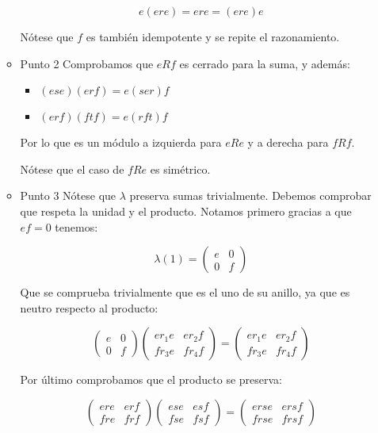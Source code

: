 \documentclass[11pt]{article}
\begin{document}
\begin{itemize}
\begin{itemize}
\[
e(ere) = ere = (ere)e
\]

Nótese que $f$ es también idempotente y se repite el razonamiento.

\item Punto 2
\label{sec-7-4-3-1-2}
Comprobamos que $eRf$ es cerrado para la suma, y además:

\begin{itemize}
\item $(ese)(erf) = e(ser)f$
\item $(erf)(ftf) = e(rft)f$
\end{itemize}

Por lo que es un módulo a izquierda para $eRe$ y a derecha para $fRf$.

Nótese que el caso de $fRe$ es simétrico.

\item Punto 3
\label{sec-7-4-3-1-3}
Nótese que $\lambda$ preserva sumas trivialmente. Debemos comprobar que respeta
la unidad y el producto. Notamos primero gracias a que $ef=0$ tenemos:

\[
\lambda(1) = \begin{pmatrix}e&0\\0&f\end{pmatrix}
\]

Que se comprueba trivialmente que es el uno de su anillo, ya que es neutro
respecto al producto:

\[\begin{pmatrix}e&0\\0&f\end{pmatrix}\begin{pmatrix}er_1e&er_2f\\fr_3e&fr_4f\end{pmatrix} =\begin{pmatrix}er_1e&er_2f\\fr_3e&fr_4f\end{pmatrix}\]

Por último comprobamos que el producto se preserva:

\[\begin{pmatrix}ere&erf\\fre&frf\end{pmatrix}\begin{pmatrix} ese & esf \\ fse & fsf \end{pmatrix}
= \begin{pmatrix}erse&ersf\\frse&frsf\end{pmatrix}\]


\end{itemize}
\end{itemize}
\end{document}
